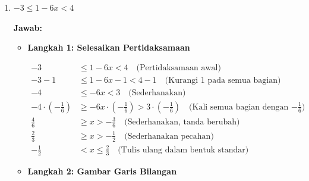 \documentclass[10pt,a4paper]{article}
\newcounter{eqblock}
\newcommand{\reseteq}{%
  \stepcounter{eqblock}%
  \setcounter{equation}{0}%
  \renewcommand{\theHequation}{\arabic{eqblock}.\arabic{equation}}%
}
\begin{document}
\begin{enumerate}
\begin{itemize}
\item \textbf{Langkah 3: Tentukan HP}

$\text{HP} = (1, \infty)$

\end{itemize}

\item $-3 \leq 1 - 6x < 4$

\textbf{Jawab:}

\begin{itemize}
\item \textbf{Langkah 1: Selesaikan Pertidaksamaan}

\reseteq

\begin{align}
-3 &\leq 1-6x < 4 \quad \text{(Pertidaksamaan awal)} \\
-3 - 1 &\leq 1-6x - 1 < 4 - 1 \quad \text{(Kurangi 1 pada semua bagian)} \\
-4 &\leq -6x < 3 \quad \text{(Sederhanakan)} \\
-4 \cdot \left(-\frac{1}{6}\right) &\geq -6x \cdot \left(-\frac{1}{6}\right) > 3 \cdot \left(-\frac{1}{6}\right) \quad \text{(Kali semua bagian dengan $-\frac{1}{6}$)} \\
\frac{4}{6} &\geq x > -\frac{3}{6} \quad \text{(Sederhanakan, tanda berubah)} \\
\frac{2}{3} &\geq x > -\frac{1}{2} \quad \text{(Sederhanakan pecahan)} \\
-\frac{1}{2} &< x \leq \frac{2}{3} \quad \text{(Tulis ulang dalam bentuk standar)}
\end{align}

\item \textbf{Langkah 2: Gambar Garis Bilangan}

\begin{center}
\end{center}
\end{itemize}
\end{enumerate}
\end{document}
